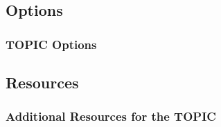 \documentclass{beamer}
\begin{document}
\subsection{Options}		
	\begin{frame}
		\frametitle{TOPIC Options}
		\begin{outline}
			\1 
		\end{outline}
	\end{frame}

\subsection{Resources}		
	\begin{frame}
		\frametitle{Additional Resources for the TOPIC}
		\begin{outline}
			\1 
			\2 
			\2
		\end{outline}
	\end{frame}

	
\end{document}

